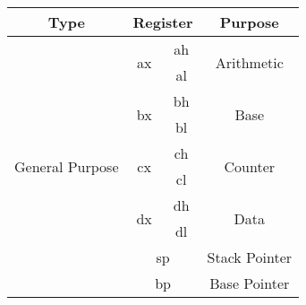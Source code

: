 \documentclass[11pt,a5paper,footinclude=true,headinclude=true]{scrbook} %
\begin{document}
\begin{center}
	\begin{tabular}{|c|c|c|c|}
		\hline
		Type                              & \multicolumn{2}{c|}{Register}            & Purpose                                                          \\\hline\hline
		\multirow{16}{*}{General Purpose} & \multirow{2}{*}{ax}                      & ah                                 & \multirow{2}{*}{Arithmetic} \\
		\cline{3-3}
		                                  &                                          & al                                 &                             \\
		\cline{2-4}
		                                  & \multirow{2}{*}{bx}                      & bh                                 & \multirow{2}{*}{Base}       \\
		\cline{3-3}
		                                  &                                          & bl                                 &                             \\
		\cline{2-4}
		                                  & \multirow{2}{*}{cx}                      & ch                                 & \multirow{2}{*}{Counter}    \\
		\cline{3-3}
		                                  &                                          & cl                                 &                             \\
		\cline{2-4}
		                                  & \multirow{2}{*}{dx}                      & dh                                 & \multirow{2}{*}{Data}       \\
		\cline{3-3}
		                                  &                                          & dl                                 &                             \\
		\cline{2-4}
		                                  & \multicolumn{2}{c|}{\multirow{2}{*}{sp}} & \multirow{2}{*}{Stack Pointer}                                   \\
		                                  & \multicolumn{2}{c|}{}                    &                                                                  \\
		\cline{2-4}
		                                  & \multicolumn{2}{c|}{\multirow{2}{*}{bp}} & \multirow{2}{*}{Base Pointer}                                    \\
		                                  & \multicolumn{2}{c|}{}                    &                                                                  \\

\end{tabular}
\end{center}
\end{document}
